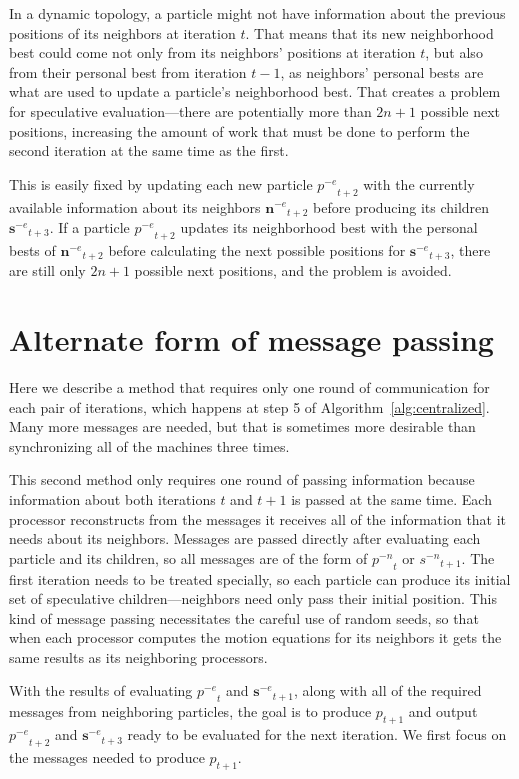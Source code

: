 \documentclass[ms,electronic,twosidetoc,letterpaper,chaptercenter,parttop,equalmargins]{byumsphd}
\newcommand{\alg}[1]{Algorithm~\ref{alg:#1}}
\providecommand{\noeval}[1]{\ensuremath{#1^{-e}}}
\providecommand{\nonbest}[1]{\ensuremath{#1^{-n}}}
\providecommand{\p}{\ensuremath{p}}
\providecommand{\s}{\ensuremath{s}}
\providecommand{\sset}{\ensuremath{\mathbf{s}}}
\providecommand{\nset}{\ensuremath{\mathbf{n}}}
\begin{document}
In a dynamic topology, a particle might not have information about the previous
positions of its neighbors at iteration $t$.  That means that its new
neighborhood best could come not only from its neighbors' positions at
iteration $t$, but also from their personal best from iteration $t-1$, as
neighbors' personal bests are what are used to update a particle's neighborhood
best.  That creates a problem for speculative evaluation---there are
potentially more than $2n+1$ possible next positions, increasing the amount of
work that must be done to perform the second iteration at the same time as the
first.

This is easily fixed by updating each new particle $\noeval{\p}_{t+2}$ with the
currently available information about its neighbors $\noeval{\nset}_{t+2}$
before producing its children $\noeval{\sset}_{t+3}$.  If a particle
$\noeval{\p}_{t+2}$ updates its neighborhood best with the personal bests of
$\noeval{\nset}_{t+2}$ before calculating the next possible positions for
$\noeval{\sset}_{t+3}$, there are still only $2n+1$ possible next positions,
and the problem is avoided.

\chapter{Alternate form of message passing}

Here we describe a method that requires only one round of communication for
each pair of iterations, which happens at step 5 of \alg{centralized}.  Many
more messages are needed, but that is sometimes more desirable than
synchronizing all of the machines three times.

This second method only requires one round of passing information because
information about both iterations $t$ and $t+1$ is passed at the same time.
Each processor reconstructs from the messages it receives all of the
information that it needs about its neighbors.  Messages are passed directly
after evaluating each particle and its children, so all messages are of the
form of $\nonbest{\p}_t$ or $\nonbest{\s}_{t+1}$.  The first iteration needs to
be treated specially, so each particle can produce its initial set of
speculative children---neighbors need only pass their initial position.  This
kind of message passing necessitates the careful use of random seeds, so that
when each processor computes the motion equations for its neighbors it gets the
same results as its neighboring processors.

With the results of evaluating $\noeval{\p}_t$ and $\noeval{\sset}_{t+1}$,
along with all of the required messages from neighboring particles, the goal is
to produce $\p_{t+1}$ and output $\noeval{\p}_{t+2}$ and $\noeval{\sset}_{t+3}$
ready to be evaluated for the next iteration.  We first focus on the messages
needed to produce $\p_{t+1}$.
\end{document}
